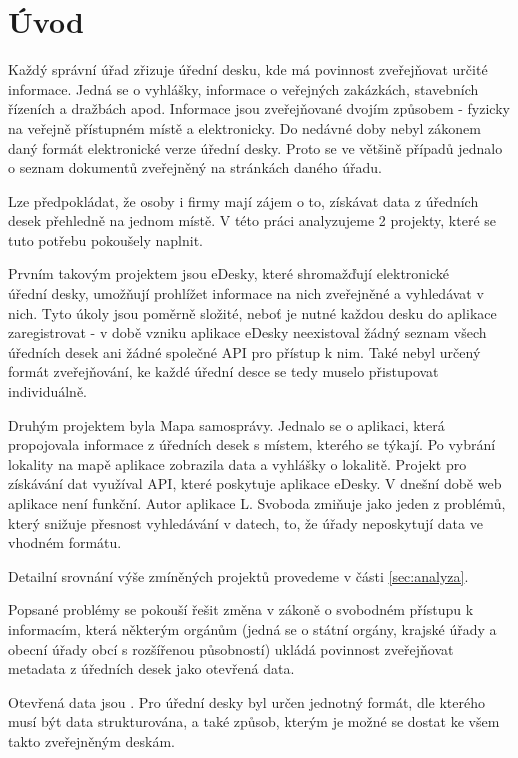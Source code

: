 \chapter*{Úvod}

Každý správní úřad zřizuje úřední desku, kde má povinnost zveřejňovat určité informace. Jedná se o vyhlášky, informace o veřejných zakázkách, stavebních řízeních a dražbách apod. Informace jsou zveřejňované dvojím způsobem - fyzicky na veřejně přístupném místě a elektronicky. Do nedávné doby nebyl zákonem daný formát elektronické verze úřední desky. Proto se ve většině případů jednalo o seznam dokumentů zveřejněný na stránkách daného úřadu.

Lze předpokládat, že osoby i firmy mají zájem o to, získávat data z úředních desek přehledně na jednom místě. V této práci analyzujeme 2 projekty, které se tuto potřebu pokoušely naplnit. 

Prvním takovým projektem jsou eDesky, které shromažďují elektronické \\ úřední desky, umožňují prohlížet informace na nich zveřejněné a vyhledávat v nich. Tyto úkoly jsou poměrně složité, neboť je nutné každou desku do aplikace zaregistrovat - v době vzniku aplikace eDesky neexistoval žádný seznam všech úředních desek ani žádné společné API pro přístup k nim. Také nebyl určený formát zveřejňování, ke každé úřední desce se tedy muselo přistupovat individuálně.

Druhým projektem byla Mapa samosprávy. Jednalo se o aplikaci, která propojovala informace z úředních desek s místem, kterého se týkají. Po vybrání lokality na mapě aplikace zobrazila data a vyhlášky o lokalitě. Projekt pro získávání dat využíval API, které poskytuje aplikace eDesky. V dnešní době web aplikace není funkční. Autor aplikace L. Svoboda zmiňuje jako jeden z problémů, který snižuje přesnost vyhledávání v datech, to, že úřady neposkytují data ve vhodném formátu.\cite{Aktualne}

Detailní srovnání výše zmíněných projektů provedeme v části \autoref{sec:analyza}.

Popsané problémy se pokouší řešit změna v zákoně o svobodném přístupu k informacím, která některým orgánům (jedná se o státní orgány, krajské úřady a obecní úřady obcí s rozšířenou působností) ukládá povinnost zveřejňovat metadata z úředních desek jako otevřená data. 

Otevřená data jsou  \cite{ZakonSvobodny3-11} . Pro úřední desky byl určen jednotný formát, dle kterého musí být data strukturována, a také způsob, kterým je možné se dostat ke všem takto zveřejněným deskám.

